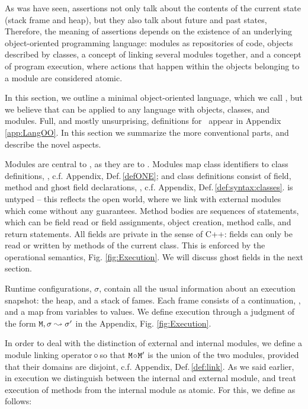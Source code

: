 \renewcommand{\appref}[1]{, c.f. Appendix, Def.\,\ref{#1}}

 
As was have seen, \Chainmail assertions not only talk about the contents of the current state (stack frame and heap),
but they also talk about future and past states, Therefore, the meaning of \Chainmail assertions depends on the existence of an
underlying object-oriented programming language: modules as repositories of code, objects described by classes,
a concept of linking several modules together, and a concept of 
program execution, where  actions that happen within the objects belonging to a module are considered atomic.

In this section, we outline a minimal object-oriented language, which we call  \LangOO, but we believe that \Chainmail can be applied to 
any language with objects, classes, and modules.
Full, and mostly unsurprising,
 definitions for  \LangOO~appear in Appendix \ref{app:LangOO}. 
In this section we summarize the more conventional parts, and describe the novel aspects. 

Modules are central to \LangOO, as they are to \Chainmail. Modules map
class identifiers to class definitions, \appref{defONE}; and class
definitions consist of field, method and ghost field declarations,
\appref{def:syntax:classes}.  \LangOO is untyped -- this reflects the
open world, where we link with external modules which come without any
guarantees.
Method bodies are sequences of 
statements, which  can be field read or field assignments, object
creation, method calls, and return statements. 
All fields are private in the sense of C++: fields can only be read or
written by methods of the current class.
This is enforced by the operational semantics, \cf Fig.  \ref{fig:Execution}.
We will discuss ghost fields in the next section.

Runtime configurations, $\sigma$,  contain   all the usual information about an execution snapshot: the heap, and a
stack of fames. Each frame consists of a continuation, , and a map from variables to values. 
We define execution  through a judgment of the form ${\mbox{\tt{\ensuremath{{\mbox{\tt{M}}}}}}}, \sigma \leadsto \sigma'$ in the Appendix, Fig.  \ref{fig:Execution}. 
%
  

In  order to deal with the distinction of external and internal modules, we define a module linking operator  $\!\circ\!$ so that
${\mbox{\tt{\ensuremath{{\mbox{\tt{M}}}}}}}\!\circ\!{\mbox{\tt{\ensuremath{{\mbox{\tt{M}}}}}}}'$ is the union of the two modules, provided that their domains are disjoint\appref{def:link}.
%
As we said earlier, in execution we distinguish  between the internal and external module, and treat  execution of 
methods from the internal module as atomic. For this, we define as follows:

